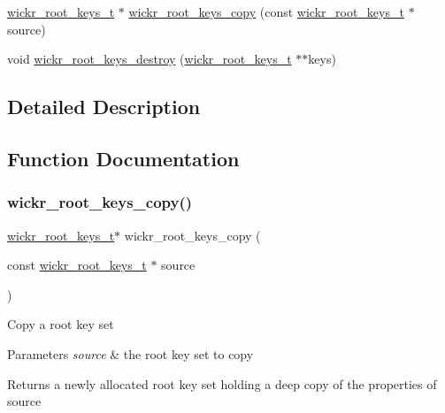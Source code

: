 \begin{DoxyCompactItemize}
\item 
\hyperlink{structwickr__root__keys}{wickr\+\_\+root\+\_\+keys\+\_\+t} $\ast$ \hyperlink{group__wickr__root__keys_gadda1b8fd1b5cc1cf6b7b2b0e72912858}{wickr\+\_\+root\+\_\+keys\+\_\+copy} (const \hyperlink{structwickr__root__keys}{wickr\+\_\+root\+\_\+keys\+\_\+t} $\ast$source)
\item 
void \hyperlink{group__wickr__root__keys_gacabc33b7c56cbc84a5085d0a4330694f}{wickr\+\_\+root\+\_\+keys\+\_\+destroy} (\hyperlink{structwickr__root__keys}{wickr\+\_\+root\+\_\+keys\+\_\+t} $\ast$$\ast$keys)
\end{DoxyCompactItemize}


\subsection{Detailed Description}


\subsection{Function Documentation}
\mbox{\label{group__wickr__root__keys_gadda1b8fd1b5cc1cf6b7b2b0e72912858}} 
\subsubsection{\texorpdfstring{wickr\+\_\+root\+\_\+keys\+\_\+copy()}{wickr\_root\_keys\_copy()}}
{\footnotesize\ttfamily \hyperlink{structwickr__root__keys}{wickr\+\_\+root\+\_\+keys\+\_\+t}$\ast$ wickr\+\_\+root\+\_\+keys\+\_\+copy (\begin{DoxyParamCaption}\item[{const \hyperlink{structwickr__root__keys}{wickr\+\_\+root\+\_\+keys\+\_\+t} $\ast$}]{source }\end{DoxyParamCaption})}

Copy a root key set


\begin{DoxyParams}{Parameters}
{\em source} & the root key set to copy \\
\hline
\end{DoxyParams}
\begin{DoxyReturn}{Returns}
a newly allocated root key set holding a deep copy of the properties of \textquotesingle{}source\textquotesingle{} 
\end{DoxyReturn}
\mbox{\label{group__wickr__root__keys_gab6289774ce4bcbdc08584695f9b7c34c}} 

